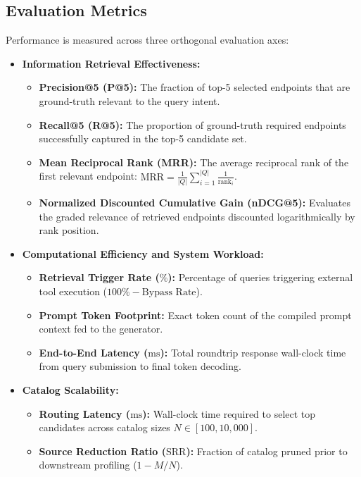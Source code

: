 \subsection{Evaluation Metrics}
Performance is measured across three orthogonal evaluation axes:
\begin{itemize}
    \item \textbf{Information Retrieval Effectiveness:}
    \begin{itemize}
        \item \textbf{Precision@5 (P@5):} The fraction of top-5 selected endpoints that are ground-truth relevant to the query intent.
        \item \textbf{Recall@5 (R@5):} The proportion of ground-truth required endpoints successfully captured in the top-5 candidate set.
        \item \textbf{Mean Reciprocal Rank (MRR):} The average reciprocal rank of the first relevant endpoint: $\text{MRR} = \frac{1}{|Q|} \sum_{i=1}^{|Q|} \frac{1}{\text{rank}_i}$.
        \item \textbf{Normalized Discounted Cumulative Gain (nDCG@5):} Evaluates the graded relevance of retrieved endpoints discounted logarithmically by rank position.
    \end{itemize}
    \item \textbf{Computational Efficiency and System Workload:}
    \begin{itemize}
        \item \textbf{Retrieval Trigger Rate ($\%$):} Percentage of queries triggering external tool execution ($100\% - \text{Bypass Rate}$).
        \item \textbf{Prompt Token Footprint:} Exact token count of the compiled prompt context fed to the generator.
        \item \textbf{End-to-End Latency ($\text{ms}$):} Total roundtrip response wall-clock time from query submission to final token decoding.
    \end{itemize}
    \item \textbf{Catalog Scalability:}
    \begin{itemize}
        \item \textbf{Routing Latency ($\text{ms}$):} Wall-clock time required to select top candidates across catalog sizes $N \in [100, 10{,}000]$.
        \item \textbf{Source Reduction Ratio ($\text{SRR}$):} Fraction of catalog pruned prior to downstream profiling ($1 - M/N$).
    \end{itemize}
\end{itemize}
